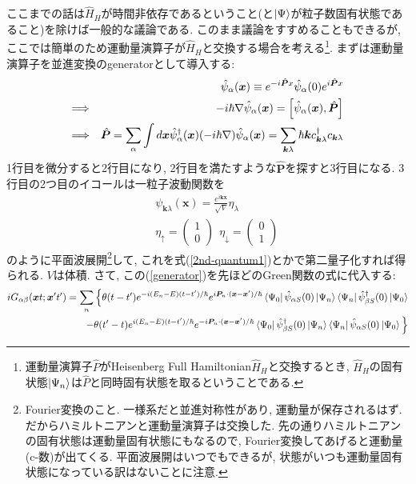 \documentclass[10.5pt,a4paper]{jreport}
\newcommand{\bx}{\bm{x}}
\newcommand{\hpsi}{\hat{\psi}}
\begin{document}
ここまでの話は$\hat{H}_H$が時間非依存であるということ(と$\ket{\Psi}$が粒子数固有状態であること)を除けば一般的な議論である. このまま議論をすすめることもできるが, ここでは簡単のため運動量演算子が$\hat{H}_H$と交換する場合を考える\footnote{運動量演算子$\hat{P}$がHeisenberg Full Hamiltonian$\hat{H}_H$と交換するとき, $\hat{H}_H$の固有状態$\ket{\Psi_n}$は$\hat{P}$と同時固有状態を取るということである.}. まずは運動量演算子を並進変換のgeneratorとして導入する:
\begin{eqnarray}
  &&\hpsi_\alpha(\bx) \equiv e^{-i\hat{\bm{P}}x}\hpsi_\alpha(0)e^{i\hat{\bm{P}}x}\label{generator}\\
  \Longrightarrow&& -i\hbar\nabla\hpsi_\alpha(\bx) = \qty[\hpsi_\alpha(\bx), \hat{\bm{P}}]\\
  \Longrightarrow&& \hat{\bm{P}} = \sum_\alpha\int d\bx \hpsi^\dagger_\alpha(\bx)(-i\hbar\nabla)\hpsi_\alpha(\bx) = \sum_{\bm{k}\lambda}\hbar\bm{k}c^\dagger_{\bm{k}\lambda}c_{\bm{k}\lambda}
\end{eqnarray}
1行目を微分すると2行目になり, 2行目を満たすような$\hat{\bm{P}}$を探すと3行目になる. 3行目の2つ目のイコールは一粒子波動関数を
\begin{eqnarray}
  &&\psi_{\bm{k}\lambda}(\bx) = \frac{e^{i\bm{k}\bx}}{\sqrt{V}}\eta_{\lambda}\label{1st-plane}\\
  &&\eta_\uparrow =
  \begin{pmatrix}
    1\\
    0
  \end{pmatrix} \ \ \eta_\downarrow =
  \begin{pmatrix}
    0\\
    1
  \end{pmatrix}
\end{eqnarray}
のように平面波展開\footnote{Fourier変換のこと. 一様系だと並進対称性があり, 運動量が保存されるはず. だからハミルトニアンと運動量演算子は交換した. 先の通りハミルトニアンの固有状態は運動量固有状態にもなるので, Fourier変換してあげると運動量(c-数)が出てくる. 平面波展開はいつでもできるが, 状態がいつも運動量固有状態になっている訳はないことに注意. }して, これを式(\ref{2nd-quantum1})とかで第二量子化すれば得られる. $V$は体積. さて, この(\ref{generator})を先ほどのGreen関数の式に代入する:
\begin{eqnarray}
  \nonumber    iG_{\alpha\beta}(\bx t;\bx' t') = \sum_n\Big\{\theta(t-t')e^{-i(E_n-E)(t-t')/\hbar}e^{i\bm{P}_n\cdot(\bx - \bx')/\hbar}\bra{\Psi_0}\hat{\psi}_{\alpha S}(0)\ket{\Psi_n}\bra{\Psi_n}\hat{\psi}^\dagger_{\beta S}(0)\ket{\Psi_0}\\
    -\theta(t'-t)e^{i(E_n-E)(t-t')/\hbar}e^{-i\bm{P}_n\cdot(\bx - \bx')/\hbar}\bra{\Psi_0}\hat{\psi}^\dagger_{\beta S}(0)\ket{\Psi_n}\bra{\Psi_n}\hat{\psi}_{\alpha S}(0)\ket{\Psi_0}\Big\}
\end{eqnarray}
\end{document}
